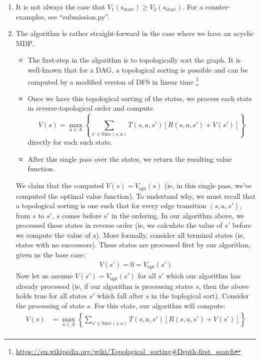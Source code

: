 \documentclass[12pt]{article}
\begin{document}
\begin{enumerate}[label=(\alph*)]
  \item It is not always the case that $V_1(s_{\text{start}}) \geq V_2(s_{\text{start}})$. For a counter-examples, see ``submission.py''.
  \item The algorithm is rather straight-forward in the case where we have an acyclic MDP.
  \begin{itemize}
    \item The first-step in the algorithm is to topologically sort the graph. It is well-known that for a DAG, a topological sorting is possible and can be computed by a modified version of DFS in linear time \footnote{\url{https://en.wikipedia.org/wiki/Topological_sorting\#Depth-first_search}}
    \item Once we have this topological sorting of the states, we process each state in reverse-topological order and compute
    $$
      V(s) = \max_{a \in A} \left\{ \sum_{s' \in \text{Succ}(s,a)}T(s,a,s' )[R(s,a,s') + V(s')] \right\}
    $$ directly for each such state.
    \item After this single pass over the states, we return the resulting value function.
  \end{itemize}
  We claim that the computed $V(s) = V_{\text{opt}}(s)$ (ie, in this single pass, we've computed the optimal value function). To undertand why, we must recall that a topological sorting is one such that for every edge transition $(s, a, s')$, from $s$ to $s'$, $s$ comes before $s'$ in the ordering. In our algorithm above, we processed these states in reverse order (ie, we calculate the value of $s'$ before we compute the value of $s$). More formally, consider all terminal states (ie, states with no successors). These states are processed first by our algorithm, given us the base case:
  \begin{align*}
    V(s') = 0 = V_\text{opt}(s') \tag{for all terminal states $s'$}
  \end{align*}
  Now let us assume $V(s') = V_\text{opt}(s')$ for all $s'$ which our algorithm has already processed (ie, if our algorithm is processing states $s$, then the above holds true for all states $s'$ which fall after $s$ in the toplogical sort). Consider the processing of state $s$. For this state, our algorithm will compute:
  \begin{align*}
    V(s) &= \max_{a \in A} \left\{ \sum_{s' \in \text{Succ}(s,a)}T(s,a,s' )[R(s,a,s') + V(s')] \right\} \tag{definition of our algorithm} \\

\end{align*}
\end{enumerate}
\end{document}
